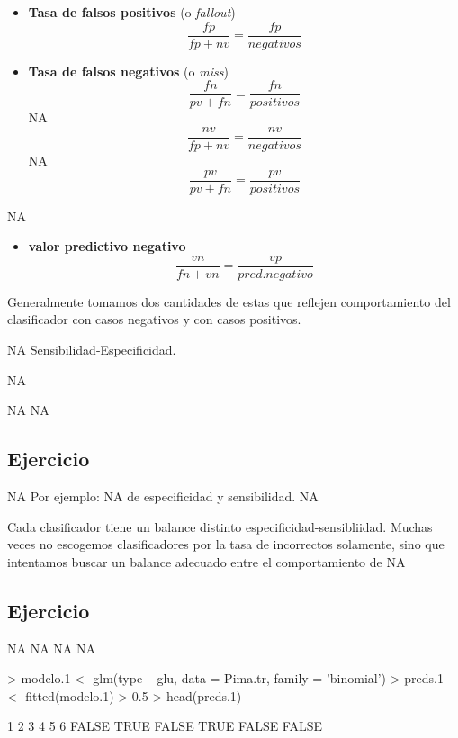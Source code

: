 \documentclass[nohyper]{tufte-handout}
\begin{document}
\begin{itemize}
\item {\bf Tasa de falsos positivos} (o {\em fallout})
$$\frac{fp}{fp+nv}=\frac{fp}{negativos}$$
\item {\bf Tasa de falsos negativos}  (o {\em miss})
$$\frac{fn}{pv+fn}=\frac{fn}{positivos}$$
NA
$$\frac{nv}{fp+nv}=\frac{nv}{negativos}$$
NA
$$\frac{pv}{pv+fn}=\frac{pv}{positivos}$$ 
\end{itemize}

NA

\begin{itemize}
NA
$$\frac{vp}{vp+fp}=\frac{vp}{pred.positivo}$$
\item {\bf valor predictivo negativo}
$$\frac{vn}{fn+vn}=\frac{vp}{pred.negativo}$$

\end{itemize}

Generalmente tomamos dos cantidades de estas que reflejen comportamiento
del clasificador con casos negativos y con casos positivos.

\begin{shaded}
NA
Sensibilidad-Especificidad.
\end{shaded}

NA

\begin{itemize}
NA
NA
\end{itemize}

\subsection{Ejercicio}
NA
Por ejemplo:
NA
de especificidad y sensibilidad.
NA


\begin{shaded}
Cada clasificador tiene un balance distinto especificidad-sensibliidad. 
Muchas veces no escogemos clasificadores por la tasa de incorrectos solamente,
sino que intentamos buscar un balance adecuado entre el comportamiento de
NA
\end{shaded}

\subsection{Ejercicio}
NA
NA
NA
NA


\begin{Schunk}
\begin{Sinput}
> modelo.1 <- glm(type ~ glu, data = Pima.tr, family = 'binomial')
> preds.1 <- fitted(modelo.1) > 0.5
> head(preds.1)
\end{Sinput}
\begin{Soutput}
    1     2     3     4     5     6 
FALSE  TRUE FALSE  TRUE FALSE FALSE 
\end{Soutput}
\end{Schunk}
\end{document}
